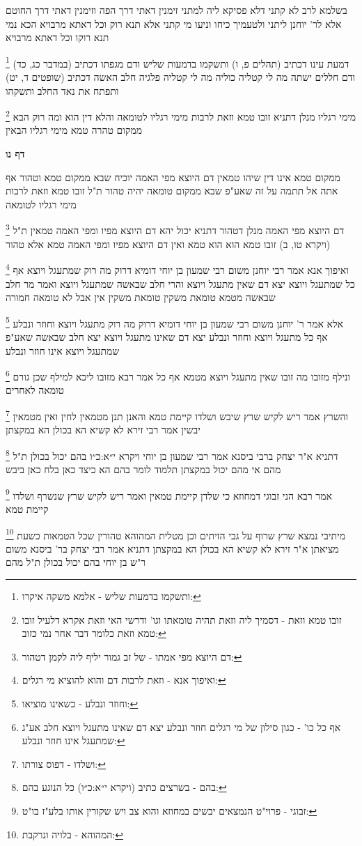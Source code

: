 \documentclass[12pt, openany]{book}
\newcommand{\sethebfont}{
\fontsize{10.5pt}{21.0pt} \selectfont
}
\newcommand{\twocol}[1]{
	{\sethebfont \begin{multicols}{2}
			#1
	\end{multicols}}	
}
\newcommand{\sectname}{}
\newcommand{\newsection}[1]{
	\renewcommand{\sectname}{#1}	
	\vspace{-\baselineskip}
	\begin{center}
		\textbf{%
\fontsize{16pt}{16pt}\selectfont
			#1}
	\end{center}
	\vspace{-\baselineskip}
	\nopagebreak
}
\newcommand{\footnotecomment}[1]{
	\renewcommand\thefootnote{}
	\footnote{#1}}
\newcommand{\commenta}[1]{\footnotecomment{#1}}
\begin{document}
{{בשלמא לרב לא קתני דלא פסיקא ליה למתני זימנין דאתי דרך הפה וזימנין דאתי דרך החוטם אלא לר' יוחנן ליתני 
ולטעמיך כיחו וניעו מי קתני אלא תנא רוק וכל דאתא מרבויא הכא נמי תנא רוקו וכל דאתא מרבויא 
\commenta{ותשקמו בדמעות שליש - אלמא משקה איקרו:}
דמעת עינו דכתיב (תהלים פ, ו) ותשקמו בדמעות שליש ודם מגפתו דכתיב (במדבר כג, כד) ודם חללים ישתה מה לי קטליה כוליה מה לי קטליה פלגיה חלב האשה דכתיב (שופטים ד, יט) ותפתח את נאד החלב ותשקהו 
\commenta{זובו טמא וזאת - דסמיך ליה וזאת תהיה טומאתו וגו' ודרשי האי וזאת אקרא דלעיל זובו טמא וזאת כלומר דבר אחר נמי כזוב:}
מימי רגליו מנלן דתניא זובו טמא וזאת לרבות מימי רגליו לטומאה והלא דין הוא ומה רוק הבא ממקום טהרה טמא מימי רגליו הבאין
\clearpage}

\newsection{דף נו}
\twocol{ממקום טמא אינו דין שיהו טמאין דם היוצא מפי האמה יוכיח שבא ממקום טמא וטהור אף אתה אל תתמה על זה שאע"פ שבא ממקום טומאה יהיה טהור ת"ל זובו טמא וזאת לרבות מימי רגליו לטומאה 
\commenta{דם היוצא מפי אמתו - של זב גמור יליף ליה לקמן דטהור:}
דם היוצא מפי האמה מנלן דטהור דתניא יכול יהא דם היוצא מפיו ומפי האמה טמאין ת"ל (ויקרא טו, ב) זובו טמא הוא הוא טמא ואין דם היוצא מפיו ומפי האמה טמא אלא טהור 
\commenta{ואיפוך אנא - וזאת לרבות דם והוא להוציא מי רגלים:}
ואיפוך אנא אמר רבי יוחנן משום רבי שמעון בן יוחי דומיא דרוק מה רוק שמתעגל ויוצא אף כל שמתעגל ויוצא יצא דם שאין מתעגל ויוצא 
והרי חלב שבאשה שמתעגל ויוצא ואמר מר חלב שבאשה מטמא טומאת משקין טומאת משקין אין אבל לא טומאה חמורה 
\commenta{וחוזר ונבלע - כשאינו מוציאו:}
אלא אמר ר' יוחנן משום רבי שמעון בן יוחי דומיא דרוק מה רוק מתעגל ויוצא וחוזר ונבלע אף כל מתעגל ויוצא וחוזר ונבלע יצא דם שאינו מתעגל ויוצא יצא חלב שבאשה שאע"פ שמתעגל ויוצא אינו חוזר ונבלע 
\commenta{אף כל כו' - כגון סילון של מי רגלים חוזר ונבלע יצא דם שאינו מתעגל ויוצא חלב אע"ג שמתעגל אינו חוזר ונבלע:}
ונילף מזובו מה זובו שאין מתעגל ויוצא מטמא אף כל אמר רבא מזובו ליכא למילף שכן גורם טומאה לאחרים
\commenta{ושלדו - דפוס צורתו:}
והשרץ אמר ריש לקיש שרץ שיבש ושלדו קיימת טמא והאנן תנן מטמאין לחין ואין מטמאין יבשין אמר רבי זירא לא קשיא הא בכולן הא במקצתן 
\commenta{בהם - בשרצים כתיב (ויקרא י״א:כ״ו) כל הנוגע בהם:}
דתניא א"ר יצחק ברבי ביסנא אמר רבי שמעון בן יוחי {ויקרא י״א:כ״ו } בהם יכול בכולן ת"ל מהם 
אי מהם יכול במקצתן תלמוד לומר בהם הא כיצד כאן בלח כאן ביבש 
\commenta{זבוגי - פרוי"ט הנמצאים יבשים במחוזא והוא צב ויש שקורין אותו בלע"ז בו"ט:}
אמר רבא הני זבוגי דמחוזא כי שלדן קיימת טמאין ואמר ריש לקיש שרץ שנשרף ושלדו קיימת טמא 
\commenta{המהוהא - בלויה ונרקבת:}
מיתיבי נמצא שרץ שרוף על גבי הזיתים וכן מטלית המהוהא טהורין שכל הטמאות כשעת מציאתן א"ר זירא לא קשיא הא בכולן הא במקצתן 
דתניא אמר רבי יצחק בר' ביסנא משום ר"ש בן יוחי בהם יכול בכולן ת"ל מהם 
}}
\end{document}
